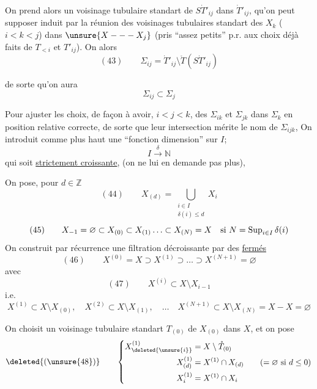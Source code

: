 On prend alors un voisinage tubulaire standart
 de $S\dot T'_{ij}$ dans $\dot T'_{ij}$,
qu'on peut supposer induit par la réunion 
des voisinages tubulaires standart des $X_k$ ($i<k<j$)
dans $\unsure{X---X_j}$
(pris ``assez petits'' p.r. aux choix déjà faits de $T_{<i}$
et  $T'_{ij}$).
On  alors
\[
(43)\qquad\Sigma_{ij}=\dot T'_{ij}\setminus\mathring T(S\dot T'_{ij})
\]

de sorte qu'on aura
\[
\Sigma_{ij}\subset\Sigma_j
\]

Pour ajuster les choix, de façon à avoir,
$i<j<k$, des $\Sigma_{ik}$ et $\Sigma_{jk}$ dans $\Sigma_k$ en
position relative correcte, de sorte que leur intersection
mérite le nom de $\Sigma_{ijk}$,
On introduit comme plus haut une ``fonction dimension'' sur $I$;
\[
I\xrightarrow{\delta}\mathbb N
\]
qui soit \uline{strictement croissante}, 
(on ne lui en demande pas plus),

On pose, pour $d\in\mathbb Z$
\[
(44)\qquad X_{(d)}=\bigcup_{\substack{i\in I\\\delta(i)\leq d}}X_i
\]
\[
(45)\qquad X_{-1}=\varnothing\subset X_{(0)}\subset X_{(1)}\ldots
\subset X_{(N)}=X\quad\hbox{si }N=\operatorname{Sup}_{i\in I}\delta(i)
\]
On construit par récurrence une filtration décroissante par des
\uline{fermés}
\[
(46)\qquad X^{(0)}=X\supset X^{(1)}\supset\ldots\supset X^{(N+1)}=\varnothing
\]
avec
\[
(47)\qquad X^{(i)}\subset X\setminus X_{i-1}
\]
i.e.
\[
X^{(1)}\subset X\setminus X_{(0)},\quad
X^{(2)}\subset X\setminus X_{(1)},\quad\ldots\quad
X^{(N+1)}\subset X\setminus X_{(N)}=X-X=\varnothing
\]

On choisit un voisinage tubulaire standart $T_{(0)}$ de
$X_{(0)}$ dans $X$, et on pose
\[
\deleted{(\unsure{48})}\qquad
\left\{\begin{aligned}
X^{(1)}_{\deleted{\unsure{i}}}&=X\setminus\mathring T_{(0)}\\
X^{(1)}_{(d)}&=X^{(1)}\cap X_{(d)}\qquad(=\varnothing\text{ si }d\leq0)\\
X^{(1)}_i&=X^{(1)}\cap X_i
\end{aligned}\right.
\]

